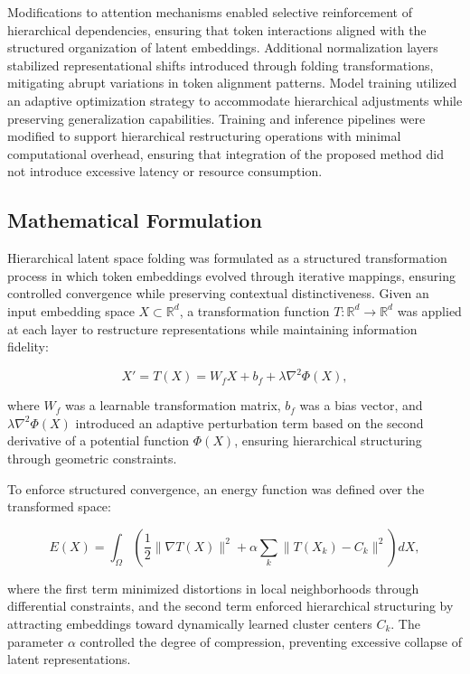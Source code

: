 \documentclass[5p,times]{elsarticle}
\begin{document}
Modifications to attention mechanisms enabled selective reinforcement of hierarchical dependencies, ensuring that token interactions aligned with the structured organization of latent embeddings. Additional normalization layers stabilized representational shifts introduced through folding transformations, mitigating abrupt variations in token alignment patterns. Model training utilized an adaptive optimization strategy to accommodate hierarchical adjustments while preserving generalization capabilities. Training and inference pipelines were modified to support hierarchical restructuring operations with minimal computational overhead, ensuring that integration of the proposed method did not introduce excessive latency or resource consumption.

\subsection{Mathematical Formulation}

Hierarchical latent space folding was formulated as a structured transformation process in which token embeddings evolved through iterative mappings, ensuring controlled convergence while preserving contextual distinctiveness. Given an input embedding space \( X \subset \mathbb{R}^d \), a transformation function \( T: \mathbb{R}^d \to \mathbb{R}^d \) was applied at each layer to restructure representations while maintaining information fidelity:

\begin{equation}
	X' = T(X) = W_f X + b_f + \lambda \nabla^2 \Phi(X),
\end{equation}

where \( W_f \) was a learnable transformation matrix, \( b_f \) was a bias vector, and \( \lambda \nabla^2 \Phi(X) \) introduced an adaptive perturbation term based on the second derivative of a potential function \( \Phi(X) \), ensuring hierarchical structuring through geometric constraints.

To enforce structured convergence, an energy function was defined over the transformed space:

\begin{equation}
	E(X) = \int_{\Omega} \left( \frac{1}{2} \|\nabla T(X)\|^2 + \alpha \sum_{k} \| T(X_k) - C_k \|^2 \right) dX,
\end{equation}

where the first term minimized distortions in local neighborhoods through differential constraints, and the second term enforced hierarchical structuring by attracting embeddings toward dynamically learned cluster centers \( C_k \). The parameter \( \alpha \) controlled the degree of compression, preventing excessive collapse of latent representations.
\end{document}

